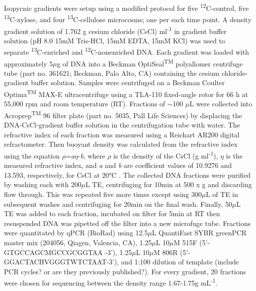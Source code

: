  Isopycnic gradients were setup using a modified protocol \cite{Neufeld_2007} for five \textsuperscript{12}C-control, five \textsuperscript{13}C-xylose, and four \textsuperscript{13}C-cellulose microcosms; one per each time point. A density gradient solution of 1.762 g cesium chloride (CsCl) ml\textsuperscript{-1} in gradient buffer solution (pH 8.0 15mM Tris-HCl, 15mM EDTA, 15mM KCl) was used to separate \textsuperscript{13}C-enriched and \textsuperscript{12}C-nonenriched DNA. Each gradient was loaded with approximately 5$\mu$g of DNA into a Beckman OptiSeal\textsuperscript{TM} polyallomer centrifuge tube (part no. 361621; Beckman, Palo Alto, CA) containing the cesium chloride-gradient buffer solution. Samples were centrifuged on a Beckman Coulter Optima\textsuperscript{TM} MAX-E ultracentrifuge using a TLA-110 fixed-angle rotor for 66 h at 55,000 rpm and room temperature (RT). Fractions of $\sim$100 $\mu$L were collected into Acroprep\textsuperscript{TM} 96 filter plate (part no. 5035, Pall Life Sciences) by displacing the DNA-CsCl-gradient buffer solution in the centrifugation tube with water. The refractive index of each fraction was measured using a Reichart AR200 digital refractometer. Then buoyant density was calculated from the refractive index using the equation $\rho$=\textit{a}$\eta$-\textit{b}, where $\rho$ is the density of the CsCl (g ml\textsuperscript{-1}), $\eta$ is the measured refractive index, and \textit{a} and \textit{b} are coefficient values of 10.9276 and 13.593, respectively, for CsCl at 20°C \cite{9780408708036}. The collected DNA fractions were purified by washing each with 200$\mu$L TE, centrifuging for 10min at 500 x g and discarding flow through. This was repeated five more times except using 300$\mu$L of TE in subsequent washes and centrifuging for 20min on the final wash. Finally, 50$\mu$L TE was added to each fraction, incubated on filter for 5min at RT then resuspended DNA was pipetted off the filter into a new microfuge tube.   Fractions were quantitated by qPCR (BioRad) using 12.5$\mu$L QuantiFast  SYBR greenPCR  master mix (204056, Qiagen, Valencia, CA), 1.25$\mu$L 10$\mu$M 515F (5'-GTGCCAGCMGCCGCGGTAA -3'), 1.25$\mu$L 10$\mu$M 806R (5'-GGACTACHVGGGTWTCTAAT-3'), and 1:100 dilution of template (include PCR cycles? or are they previously published?). For every gradient, 20 fractions were chosen for sequencing between the density range 1.67-1.75g mL\textsuperscript{-1}.      


